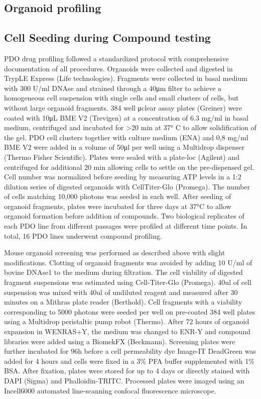 \begin{flushleft}
\section{Organoid profiling}

\subsection{Cell Seeding during Compound testing}
PDO drug profiling followed a standardized protocol with comprehensive documentation of all procedures. Organoids were collected and digested in TrypLE Express (Life technologies). Fragments were collected in basal medium with 300 U/ml DNAse and strained through a 40μm filter to achieve a homogeneous cell suspension with single cells and small clusters of cells, but without large organoid fragments. 384 well μclear assay plates (Greiner) were coated with 10μL BME V2 (Trevigen) at a concentration of 6.3 mg/ml in basal medium, centrifuged and incubated for >20 min at 37° C to allow solidification of the gel. PDO cell
clusters together with culture medium (ENA) and 0,8 mg/ml BME V2 were added in a volume of 50μl per well using a Multidrop dispenser (Thermo Fisher Scientific). Plates were sealed with a plate-loc (Agilent) and centrifuged for additional 20 min allowing cells to settle on the pre-dispensed gel. Cell number was normalized before seeding by measuring ATP levels in a 1:2 dilution series of digested organoids with CellTiter-Glo (Promega). The number of cells matching 10,000 photons was seeded in each well. After seeding of organoid fragments, plates were incubated for three days at 37°C to allow organoid formation before addition of compounds. Two biological replicates of each PDO line from different passages were profiled at different time points. In total, 16 PDO lines underwent compound profiling.

Mouse organoid screening was performed as described above with slight modifications. Clotting of organoid fragments was avoided by adding 10 U/ml of bovine DNAse1 to the medium during filtration. The cell viability of digested fragment suspensions was estimated using Cell-Titer-Glo (Promega). 40ul of cell suspension was mixed with 40ul of undiluted reagent and measured after 30 minutes on a Mithras plate reader (Berthold). Cell fragments with a viability corresponding to 5000 photons were seeded per well on pre-coated 384 well plates using a Multidrop peristaltic pump robot (Thermo). After 72 hours of organoid expansion in WENRAS+Y, the medium was changed to ENR-Y and compound libraries were added using a BiomekFX (Beckmann). Screening plates were further incubated for 96h before a cell permeability dye Image-IT DeadGreen was added for 4 hours and cells were fixed in a 3\% PFA buffer supplemented with 1\% BSA. After fixation, plates were stored for up to 4 days or directly stained with DAPI (Sigma) and Phalloidin-TRITC. Processed plates were imaged using an Incell6000 automated line-scanning confocal fluorescence microscope.


\end{flushleft}
